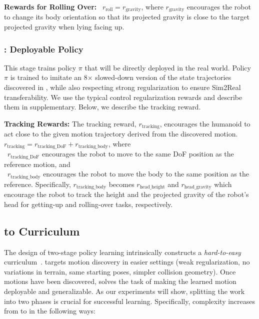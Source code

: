 \vspace{5pt}
\noindent\textbf{Rewards for Rolling Over:} ~\(r_{\text{roll}} = r_{\text{gravity}}\), where \(r_{\text{gravity}}\) encourages the robot to change its body orientation so that its projected gravity is close to the target projected gravity when lying facing up.



\subsubsection{\stwo: Deployable Policy}\label{sec:stageII}
This stage trains policy $\pi$ that will be directly deployed in the real world. Policy $\pi$ is trained to imitate an 8$\times$ slowed-down version of the state trajectories discovered in \sone, while also respecting strong regularization to ensure Sim2Real transferability. We use the typical control regularization rewards and describe them in supplementary. Below, we describe the tracking reward.

\vspace{5pt}
\noindent\textbf{Tracking Rewards:}
The tracking reward, $r_{\text{tracking}}$, encourages the humanoid to act close to the given motion trajectory derived from the discovered motion. \(r_{\text{tracking}} = r_{\text{tracking\_DoF}} + r_{\text{tracking\_body}}\), where \\
\textbullet~\(r_{\text{tracking\_DoF}}\) encourages the robot to move to the same DoF position as the reference motion, and \\
\textbullet~\(r_{\text{tracking\_body}}\) encourages the robot to move the body to the same position as the reference.
Specifically, \(r_{\text{tracking\_body}}\) becomes \(r_{\text{head\_height}}\) and \(r_{\text{head\_gravity}}\) which encourage the robot to track the height and the projected gravity of the robot's head for getting-up and rolling-over tasks, respectively.


\subsection{\sone to \stwo Curriculum}\label{sec:curriculum}
The design of two-stage policy learning intrinsically constructs a
\textit{hard-to-easy} curriculum~\cite{CurriculumLearning09}. \sone targets
motion discovery in easier settings (weak regularization, no variations
in terrain, same starting poses, simpler collision geometry). Once motions have
been discovered, \stwo solves the task of making the learned motion deployable
and generalizable. As our experiments will show, splitting the work into two
phases is crucial for successful learning. Specifically, complexity increases
from \sone to \stwo in the following ways: 



